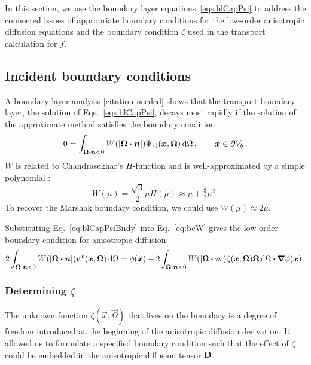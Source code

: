 In this section, we use the boundary layer equations~\eqref{eqs:blCapPsi} to
address the connected issues of appropriate boundary
conditions for the low-order anisotropic diffusion equations and the boundary
condition $\zeta$ used in the transport calculation for $f$.

\subsection{Incident boundary conditions}
A boundary layer analysis 
{\small [citation needed]}
shows that the transport boundary layer, the solution of
Eqs.~\eqref{eqs:blCapPsi}, decays most rapidly if the solution of the
approximate method satisfies the boundary condition
\begin{equation} \label{eq:bcW}
  0 = \int_{\bm{\Omega} \bm{\cdot} \bm{n} < 0} W(\left| \bm{\Omega} \bm{\cdot} \bm{n} \right|)
  \Psi_\mathrm{bl} (\bm{x}, \bm{\Omega}) \mathop{}\!\mathrm{d} \Omega\,,\qquad \bm{x} \in
  \partial V_b\,.
\end{equation}
$W$ is related to Chandrasekhar's $H$-function \cite{Cha1960} and is well-approximated by a simple polynomial \cite{Mal1991}:
\begin{equation} \label{eq:chandraW}
  W(\mu) = \frac{\sqrt{3}}{2} \mu H(\mu)
  \approx \mu + \tfrac{3}{2} \mu^2 \,.
\end{equation}
To recover the Marshak boundary condition, we could use $W(\mu) \approx 2 \mu$.

Substituting Eq.~\eqref{eq:blCapPsiBndy} into Eq.~\eqref{eq:bcW} gives the
low-order boundary condition for anisotropic diffusion:
\begin{equation} \label{eq:bcInc1}
  2\int_{\bm{\Omega}\bm{\cdot} \bm{n} < 0}
  W(\left| \bm{\Omega} \bm{\cdot} \bm{n} \right|) \psi^b(\bm{x}, \bm{\Omega}) \mathop{}\!\mathrm{d}\Omega
  = \phi(\bm{x})
  - 2\int_{\bm{\Omega}\bm{\cdot} \bm{n} < 0} W(\left| \bm{\Omega} \bm{\cdot} \bm{n} \right|)
  \zeta(\bm{x}, \bm{\Omega}) \bm{\Omega} \mathop{}\!\mathrm{d}\Omega
  \bm{\cdot} \bm{\nabla} \phi(\bm{x}) \,.
\end{equation}

\subsubsection{Determining $\zeta$}\label{sec:determiningZeta}
The unknown function $\zeta(\vec{x}, \vec{\Omega})$ that lives on the boundary
is a degree of freedom introduced at the beginning of the anisotropic
diffusion derivation. It allowed us to formulate a specified boundary condition
such that the effect of $\zeta$ could be embedded in the anisotropic diffusion
tensor $\mathbf{D}$.

